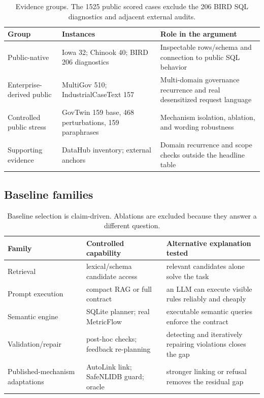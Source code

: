 \documentclass[letterpaper]{article}
\begin{document}
\begin{table}[h]
\centering
\scriptsize
\setlength{\tabcolsep}{2pt}
\begin{tabular}{>{\raggedright\arraybackslash}p{.20\linewidth}>{\raggedright\arraybackslash}p{.31\linewidth}>{\raggedright\arraybackslash}p{.39\linewidth}}
\toprule
Group & Instances & Role in the argument \\
\midrule
Public-native & Iowa 32; Chinook 40; BIRD 206 diagnostics & Inspectable rows/schema and connection to public SQL behavior \\
Enterprise-derived public & MultiGov 510; IndustrialCaseText 157 & Multi-domain governance recurrence and real desensitized request language \\
Controlled public stress & GovTwin 159 base, 468 perturbations, 159 paraphrases & Mechanism isolation, ablation, and wording robustness \\
Supporting evidence & DataHub inventory; external anchors & Domain recurrence and scope checks outside the headline table \\
\bottomrule
\end{tabular}
\caption{Evidence groups. The 1525 public scored cases exclude the 206 BIRD SQL diagnostics and adjacent external audits.}
\label{tab:evidence-supp}
\end{table}

\subsection{Baseline families}

\begin{table}[h]
\centering
\scriptsize
\setlength{\tabcolsep}{2pt}
\begin{tabular}{>{\raggedright\arraybackslash}p{.20\linewidth}>{\raggedright\arraybackslash}p{.32\linewidth}>{\raggedright\arraybackslash}p{.38\linewidth}}
\toprule
Family & Controlled capability & Alternative explanation tested \\
\midrule
Retrieval & lexical/schema candidate access & relevant candidates alone solve the task \\
Prompt execution & compact RAG or full contract & an LLM can execute visible rules reliably and cheaply \\
Semantic engine & SQLite planner; real MetricFlow & executable semantic queries enforce the contract \\
Validation/repair & post-hoc checks; feedback re-planning & detecting and iteratively repairing violations closes the gap \\
Published-mechanism adaptations & AutoLink link; SafeNLIDB guard; oracle & stronger linking or refusal removes the residual gap \\
\bottomrule
\end{tabular}
\caption{Baseline selection is claim-driven. Ablations are excluded because they answer a different question.}
\label{tab:baselines-supp}
\end{table}
\end{document}
